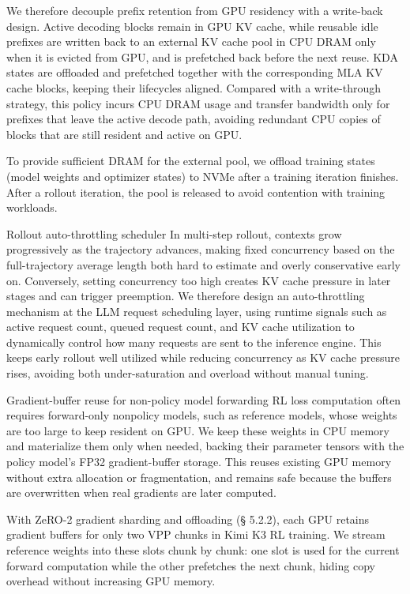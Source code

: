\documentclass[
  10
]{article}
\begin{document}
We therefore decouple prefix retention from GPU residency with a
write-back design. Active decoding blocks remain in GPU KV cache, while
reusable idle prefixes are written back to an external KV cache pool in
CPU DRAM only when it is evicted from GPU, and is prefetched back before
the next reuse. KDA states are offloaded and prefetched together with
the corresponding MLA KV cache blocks, keeping their lifecycles aligned.
Compared with a write-through strategy, this policy incurs CPU DRAM
usage and transfer bandwidth only for prefixes that leave the active
decode path, avoiding redundant CPU copies of blocks that are still
resident and active on GPU.

To provide sufficient DRAM for the external pool, we offload training
states (model weights and optimizer states) to NVMe after a training
iteration finishes. After a rollout iteration, the pool is released to
avoid contention with training workloads.

Rollout auto-throttling scheduler In multi-step rollout, contexts grow
progressively as the trajectory advances, making fixed concurrency based
on the full-trajectory average length both hard to estimate and overly
conservative early on. Conversely, setting concurrency too high creates
KV cache pressure in later stages and can trigger preemption. We
therefore design an auto-throttling mechanism at the LLM request
scheduling layer, using runtime signals such as active request count,
queued request count, and KV cache utilization to dynamically control
how many requests are sent to the inference engine. This keeps early
rollout well utilized while reducing concurrency as KV cache pressure
rises, avoiding both under-saturation and overload without manual
tuning.

Gradient-buffer reuse for non-policy model forwarding RL loss
computation often requires forward-only nonpolicy models, such as
reference models, whose weights are too large to keep resident on GPU.
We keep these weights in CPU memory and materialize them only when
needed, backing their parameter tensors with the policy model's FP32
gradient-buffer storage. This reuses existing GPU memory without extra
allocation or fragmentation, and remains safe because the buffers are
overwritten when real gradients are later computed.

With ZeRO-2 gradient sharding and offloading (§ 5.2.2), each GPU retains
gradient buffers for only two VPP chunks in Kimi K3 RL training. We
stream reference weights into these slots chunk by chunk: one slot is
used for the current forward computation while the other prefetches the
next chunk, hiding copy overhead without increasing GPU memory.
\end{document}
